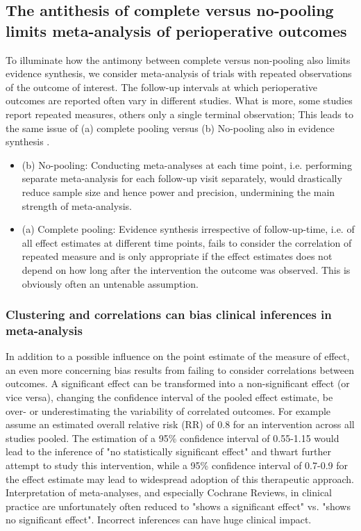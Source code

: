 \documentclass[11pt,notitlepage]{article}
\begin{document}
\subsection*{The antithesis of complete versus no-pooling limits meta-analysis of perioperative outcomes}
To illuminate how the antimony between complete versus non-pooling also limits evidence synthesis, we consider meta-analysis of trials with repeated observations of the outcome of interest. The follow-up intervals at which perioperative outcomes are reported often vary in different studies. What is more, some studies report repeated measures, others only a single terminal observation; This leads to the same issue of (a) complete pooling versus (b) No-pooling also in evidence synthesis \cite{Roth2015CriticalCare}.

\begin{itemize}
\item (b) No-pooling: 
Conducting meta-analyses at each time point, i.e. performing separate meta-analysis for each follow-up visit separately, would drastically reduce sample size and hence power and precision, undermining the main strength of meta-analysis.
\item (a) Complete pooling:
Evidence synthesis irrespective of follow-up-time, i.e. of all effect estimates at different time points, fails to consider the correlation of repeated measure and is only appropriate if the effect estimates does not depend on how long after the intervention the outcome was observed. This is obviously often an untenable assumption.
\end{itemize}

\subsubsection*{Clustering and correlations can bias clinical inferences in meta-analysis }
In addition to a possible influence on the point estimate of the measure of effect, an even more concerning bias results from failing to consider correlations between outcomes. A significant effect can be transformed into a non-significant effect (or vice versa), changing the confidence interval of the pooled effect estimate, be over- or underestimating the variability of correlated outcomes. For example assume an estimated overall relative risk (RR) of 0.8 for an intervention across all studies pooled. The estimation of a 95\% confidence interval of 0.55-1.15 would lead to the inference of "no statistically significant effect" and thwart further attempt to study this intervention, while a 95\% confidence interval of 0.7-0.9 for the effect estimate may lead to widespread adoption of this therapeutic approach. Interpretation of meta-analyses, and especially Cochrane Reviews, in clinical practice are unfortunately often reduced to "shows a significant effect" vs. "shows no significant effect". Incorrect inferences can have huge clinical impact.
\end{document}
